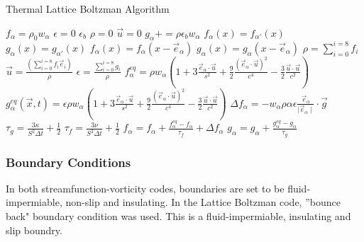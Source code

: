 \documentclass{article}
\begin{document}
\begin{algorithm}[h!]
\caption{Thermal Lattice Boltzman Algorithm}\label{alg:TLBM}
\begin{algorithmic}

\State $f_{\alpha} = \rho_0 w_{\alpha}$
\State $\epsilon = 0$
\State $\epsilon_b$
\State $\rho = 0$
\State $\vec{u} = 0$
	\State $g_{\alpha} += \rho \epsilon_b w_{\alpha} $
		\State $f_{\alpha}(x) = f_{\alpha'}(x)$
		\State $g_{\alpha}(x) = g_{\alpha'}(x)$
	\Else
		\State $f_{\alpha}(x) = f_{\alpha}(x - \vec{e}_{\alpha})$
		\State $g_{\alpha}(x) = g_{\alpha}(x - \vec{e}_{\alpha})$
	\EndIf
	\State $\rho = \sum_{i=0}^{i=8} f_{i}$
	\State $\vec{u} =\frac{(\sum_{i=0}^{i=8} f_{i} \vec{e}_{i})}{\rho} $
	\State $\epsilon = \frac{\sum_{i=0}^{i=8} g_{i}}{\rho}$
	\State $f^{eq}_{\alpha} = \rho w_{\alpha} (1 + 3 \frac{\vec{e}_{\alpha} \cdot \vec{u}}{s^2} + \frac{9}{2} \frac{(\vec{e}_{\alpha} \cdot \vec{u}  )^2}{c^4} - \frac{3}{2} \frac{\vec{u} \cdot \vec{u}}{c^2})  $
	\State $g^{eq}_{\alpha}(\vec{x}, t)  = \epsilon \rho w_{\alpha} (1 + 3 \frac{\vec{e}_{\alpha} \cdot \vec{u}}{s^2} + \frac{9}{2} \frac{(\vec{e}_{\alpha} \cdot \vec{u}  )^2}{c^4} - \frac{3}{2} \frac{\vec{u} \cdot \vec{u}}{c^2}  ) $ 
	\State ${\Delta f}_{\alpha} = - w_{\alpha} \rho \alpha \epsilon \frac{\vec{e}_{\alpha}}{\mid \vec{e}_{\alpha} \mid} \cdot \vec{g}$
	\State $\tau_g = \frac{3 \kappa}{S^2 \Delta t} + \frac{1}{2}$
	\State $\tau_f = \frac{3 \nu}{S^2 \Delta t} + \frac{1}{2}$
	\State $f_{\alpha} = f_{\alpha} + \frac{f^{eq}_{\alpha}-f_{\alpha}}{\tau_f} + {\Delta f}_{\alpha}$
	\State $g_{\alpha} = g_{\alpha} + \frac{g^{eq}_{\alpha}-g_{\alpha}}{\tau_g}$
\EndWhile
\end{algorithmic}
\end{algorithm}

\subsubsection*{Boundary Conditions}
In both streamfunction-vorticity codes, boundaries are set to be fluid-impermiable, non-slip and insulating. In the Lattice Boltzman code, ''bounce back" boundary condition was used. This is a fluid-impermiable, insulating and slip boundry.
\end{document}
